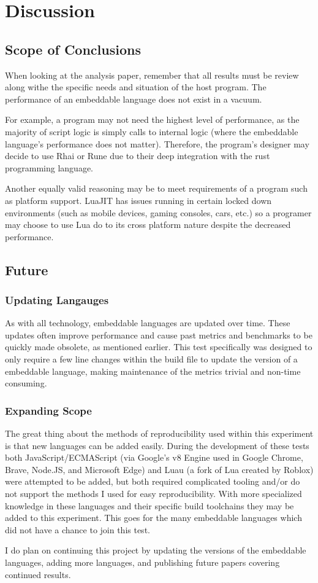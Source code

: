 \section{Discussion} \label{sec:discussion}

\subsection{Scope of Conclusions} \label{sec:discussion:importance}
When looking at the analysis paper, remember that all results must be review along withe the specific needs and situation of the host program. The performance of an embeddable language does not exist in a vacuum.

For example, a program may not need the highest level of performance, as the majority of script logic is simply calls to internal logic (where the embeddable language's performance does not matter). Therefore, the program's designer may decide to use Rhai or Rune due to their deep integration with the rust programming language.

Another equally valid reasoning may be to meet requirements of a program such as platform support. LuaJIT has issues running in certain locked down environments\cite{luajit:consoles} (such as mobile devices, gaming consoles, cars, etc.) so a programer may choose to use Lua do to its cross platform nature despite the decreased performance.

\subsection{Future}

\subsubsection{Updating Langauges}
As with all technology, embeddable languages are updated over time. These updates often improve performance and cause past metrics and benchmarks to be quickly made obsolete, as mentioned earlier. This test specifically was designed to only require a few line changes within the build file to update the version of a embeddable language, making maintenance of the metrics trivial and non-time consuming.

\subsubsection{Expanding Scope}
The great thing about the methods of reproducibility used within this experiment is that new languages can be added easily. During the development of these tests both JavaScript/ECMAScript (via Google's v8 Engine\cite{v8} used in Google Chrome, Brave, Node.JS, and Microsoft Edge) and Luau (a fork of Lua created by Roblox\cite{luau}) were attempted to be added, but both required complicated tooling and/or do not support the methods I used for easy reproducibility. With more specialized knowledge in these languages and their specific build toolchains they may be added to this experiment. This goes for the many embeddable languages which did not have a chance to join this test.

I do plan on continuing this project by updating the versions of the embeddable languages, adding more languages, and publishing future papers covering continued results.
